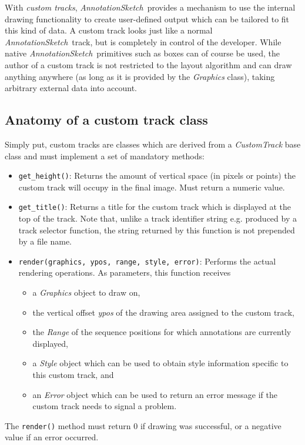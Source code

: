 \documentclass[a4paper]{scrreprt}
\newcommand{\AnnotationSketch}{\emph{AnnotationSketch}\ }
\begin{document}
With \emph{custom tracks}, \AnnotationSketch provides a mechanism to use the internal drawing functionality to create user-defined output which can be tailored to fit this kind of data. A custom track looks just like a normal \AnnotationSketch track, but is completely in control of the developer. While native \AnnotationSketch primitives such as boxes can of course be used, the author of a custom track is not restricted to the layout algorithm and can draw anything anywhere (as long as it is provided by the \emph{Graphics} class), taking arbitrary external data into account.

\subsection{Anatomy of a custom track class}

Simply put, custom tracks are classes which are derived from a \emph{CustomTrack} base class and must implement a set of mandatory methods:

\begin{itemize}
    \item \texttt{get\_height()}: Returns the amount of vertical space (in pixels or points) the custom track will occupy in the final image. Must return a numeric value.
    \item \texttt{get\_title()}: Returns a title for the custom track which is displayed at the top of the track. Note that, unlike a track identifier string e.g. produced by a track selector function, the string returned by this function is not prepended by a file name.
    \item \texttt{render(graphics, ypos, range, style, error)}: Performs the actual rendering operations. As parameters, this function receives
       \begin{itemize}
          \item a \emph{Graphics} object to draw on,
          \item the vertical offset \emph{ypos} of the drawing area assigned to the custom track,
          \item the \emph{Range} of the sequence positions for which annotations are currently displayed,
          \item a \emph{Style} object which can be used to obtain style information specific to this custom track, and
          \item an \emph{Error} object which can be used to return an error message if the custom track needs to signal a problem.
        \end{itemize}
\end{itemize}
The \texttt{render()} method must return 0 if drawing was successful, or a negative value if an error occurred.
\end{document}

